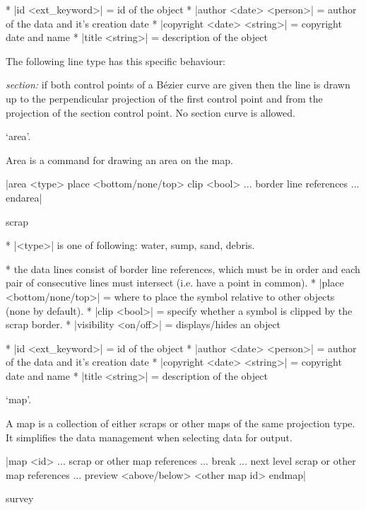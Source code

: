 \options
  * |id <ext_keyword>| = id of the object
  * |author <date> <person>| = author of the data and it's creation date
  * |copyright <date> <string>| = copyright date and name
  * |title <string>| = description of the object
\endoptions

\notes
   The following line type has this specific behaviour:

   \list
       {\it section:} if both control points of a B\'ezier curve are given 
       then the line is drawn up to the perpendicular projection of 
       the first control point and from the projection of the section control
       point. No section curve is allowed.
   \endlist
\endnotes


\subsubchapter `area'.

\description
Area is a command for drawing an area on the map.
\enddescription

\syntax
  |area <type>
         place <bottom/none/top>
         clip <bool>
       ... border line references ...
       endarea|
\endsyntax

\context
  scrap
\endcontext

\arguments
  * |<type>| is one of following: water, sump, sand, debris.
\endarguments

\comopt
  * the data lines consist of border line references, which must be 
    in order and each pair of consecutive lines must intersect 
    (i.e. have a point in common).
  * |place <bottom/none/top>| = where to place the symbol relative
    to other objects (none by default).
  * |clip <bool>| = specify whether a symbol is clipped by the scrap border.
  * |visibility <on/off>| = displays/hides an object
\endcomopt

\options
  * |id <ext_keyword>| = id of the object
  * |author <date> <person>| = author of the data and it's creation date
  * |copyright <date> <string>| = copyright date and name
  * |title <string>| = description of the object
\endoptions


\subsubchapter `map'.

\description
  A map is a collection of either scraps or other maps of the same projection type.
  It simplifies the data management when selecting data for output.
\enddescription

\syntax
  |map <id>
        ... scrap or other map references ...
        break
        ... next level scrap or other map references ...
        preview <above/below> <other map id>
      endmap|
\endsyntax

\context
  survey
\endcontext


